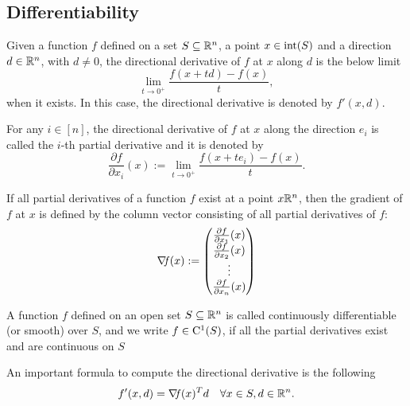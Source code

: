 \documentclass[10pt,a4paper]{article}
\begin{document}
\subsection{Differentiability}
\begin{definition}
	Given a function $f$ defined on a set $S\subseteq \mathbb{R}^n$, a point $x\in \mathord{\mathrm{int}}(S)$ and a direction $d\in \mathbb{R}^n$, with $d\neq0$, the directional derivative of $f$ at $x$ along $d$ is the below limit
	\begin{equation*}
		\lim_{t\to 0^+} \frac{f(x+td)-f(x)}{t},
	\end{equation*}
when it exists. In this case, the directional derivative is denoted by $f'(x,d)$.
\end{definition}
\begin{definition}
For any $i\in[n]$, the directional derivative of $f$ at $x$ along the direction $e_i$ is called the $i$-th partial derivative and it is denoted by 
\begin{equation*}
	\frac{\partial f}{\partial x_i}(x):=\lim_{t\to 0^+} \frac{f(x+te_i)-f(x)}{t}.
\end{equation*}
\end{definition}
\begin{definition}[Gradient]
	If all partial derivatives of a function $f$ exist at a point $x\mathbb{R}^n$, then the gradient of $f$ at $x$ is defined by the column vector consisting of all partial derivatives of $f$:
	\begin{equation*}
		\operatorname*{\mathit{\nabla \!f}} (x) := \begin{pmatrix}
			\frac{\partial f}{\partial x_1}(x)\\
			\frac{\partial f}{\partial x_2}(x)\\
			\vdots\\
			\frac{\partial f}{\partial x_n}(x)
		\end{pmatrix}
	\end{equation*}
\end{definition}
A function $f$ defined on an open set $S \subseteq \mathbb{R}^n$ is called continuously differentiable (or smooth) over $S$, and we write $f\in \mathord{\mathrm{C^1}}(S)$, if all the partial derivatives exist and are continuous on $S$
\par An important formula to compute the directional derivative is the following
\begin{equation*}
	f'(x,d) = \operatorname*{\mathit{\nabla \!f}}(x)^Td \quad \forall x \in S, d\in \mathbb{R}^n.
\end{equation*}
\end{document}

